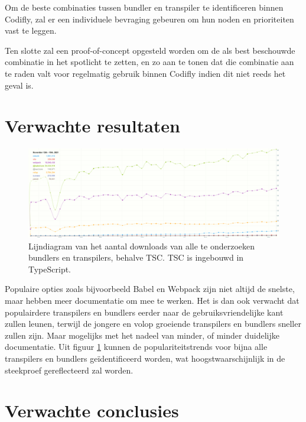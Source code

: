 Om de beste combinaties tussen bundler en transpiler te identificeren binnen Codifly, zal er een individuele bevraging gebeuren om hun noden en prioriteiten vast te leggen.

Ten slotte zal een proof-of-concept opgesteld worden om de als best beschouwde combinatie in het spotlicht te zetten, en zo aan te tonen dat die combinatie aan te raden valt voor regelmatig gebruik binnen Codifly indien dit niet reeds het geval is.

\section{Verwachte resultaten}
\label{sec:verwachte_resultaten}

\begin{figure}[!htp]
  \includegraphics[width=\linewidth]{voorstel/img/npmgraph.png}
  \caption{Lijndiagram van het aantal downloads van alle te onderzoeken bundlers en transpilers, behalve TSC. TSC is ingebouwd in TypeScript.}
  \label{fig:NpmDownloadsLineChart}
\end{figure}

Populaire opties zoals bijvoorbeeld Babel en Webpack zijn niet altijd de snelste, maar hebben meer documentatie om mee te werken. Het is dan ook verwacht dat populairdere transpilers en bundlers eerder naar de gebruiksvriendelijke kant zullen leunen, terwijl de jongere en volop groeiende transpilers en bundlers sneller zullen zijn. Maar mogelijks met het nadeel van minder, of minder duidelijke documentatie. Uit figuur \ref{fig:NpmDownloadsLineChart} kunnen de populariteitstrends voor bijna alle transpilers en bundlers geïdentificeerd worden, wat hoogstwaarschijnlijk in de steekproef gereflecteerd zal worden.

\section{Verwachte conclusies}
\label{sec:verwachte_conclusies}

